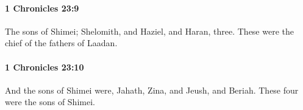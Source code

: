 		\paragraph{1 Chronicles 23:9} %
			\label{1CHRONICLES-23-9}

			The sons of Shimei; Shelomith, and Haziel, and Haran, three. These were the chief of the fathers of Laadan.


		\paragraph{1 Chronicles 23:10} %
			\label{1CHRONICLES-23-10}

			And the sons of Shimei were, Jahath, Zina, and Jeush, and Beriah. These four were the sons of Shimei.


